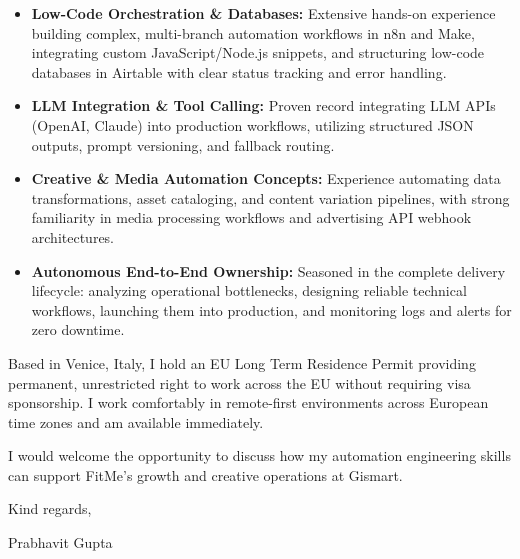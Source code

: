 \documentclass[11pt,a4paper]{article}
\begin{document}
\begin{itemize}[leftmargin=*]
    \item \textbf{Low-Code Orchestration \& Databases:} Extensive hands-on experience building complex, multi-branch automation workflows in n8n and Make, integrating custom JavaScript/Node.js snippets, and structuring low-code databases in Airtable with clear status tracking and error handling.
    \item \textbf{LLM Integration \& Tool Calling:} Proven record integrating LLM APIs (OpenAI, Claude) into production workflows, utilizing structured JSON outputs, prompt versioning, and fallback routing.
    \item \textbf{Creative \& Media Automation Concepts:} Experience automating data transformations, asset cataloging, and content variation pipelines, with strong familiarity in media processing workflows and advertising API webhook architectures.
    \item \textbf{Autonomous End-to-End Ownership:} Seasoned in the complete delivery lifecycle: analyzing operational bottlenecks, designing reliable technical workflows, launching them into production, and monitoring logs and alerts for zero downtime.
\end{itemize}

\noindent Based in Venice, Italy, I hold an EU Long Term Residence Permit providing permanent, unrestricted right to work across the EU without requiring visa sponsorship. I work comfortably in remote-first environments across European time zones and am available immediately.

\noindent I would welcome the opportunity to discuss how my automation engineering skills can support FitMe's growth and creative operations at Gismart.

\vspace{8pt}

\noindent Kind regards,

\vspace{8pt}

\noindent Prabhavit Gupta
\end{document}
